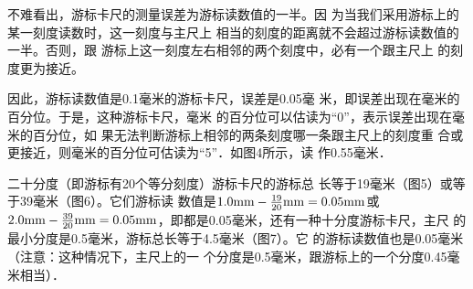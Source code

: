 不难看出，游标卡尺的测量误差为游标读数值的一半。因
为当我们采用游标上的某一刻度读数时，这一刻度与主尺上
相当的刻度的距离就不会超过游标读数值的一半。否则，跟
游标上这一刻度左右相邻的两个刻度中，必有一个跟主尺上
的刻度更为接近。

因此，游标读数值是0.1毫米的游标卡尺，误差是0.05毫
米，即误差出现在毫米的百分位。于是，这种游标卡尺，毫米
的百分位可以估读为“0”，表示误差出现在毫米的百分位，如
果无法判断游标上相邻的两条刻度哪一条跟主尺上的刻度重
合或更接近，则毫米的百分位可估读为“5”．如图4所示，读
作0.55毫米．

\begin{figure}[htp]\centering
    \begin{minipage}[t]{0.48\textwidth}
    \centering
{}
    \caption{}
    \end{minipage}
    \begin{minipage}[t]{0.48\textwidth}
    \centering
    \caption{}
    \end{minipage}
    \end{figure}

二十分度（即游标有20个等分刻度）游标卡尺的游标总
长等于19毫米（图5）或等于39毫米（图6）。它们游标读
数值是$1.0{\rm mm}-\frac{19}{20}{\rm mm}=0.05{\rm mm}$或$2.0{\rm mm}-\frac{39}{20}{\rm mm}=
0.05{\rm mm}$，即都是0.05毫米，还有一种十分度游标卡尺，主尺
的最小分度是0.5毫米，游标总长等于4.5毫米（图7）。它
的游标读数值也是0.05毫米（注意：这种情况下，主尺上的一
个分度是0.5毫米，跟游标上的一个分度0.45毫米相当）．

